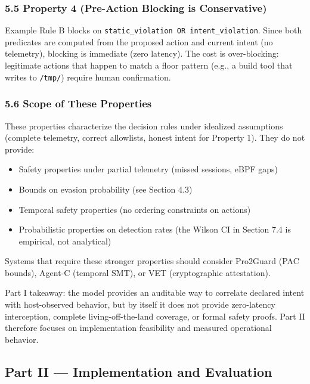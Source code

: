\documentclass[
]{article}
\providecommand{\tightlist}{%
  \setlength{\itemsep}{0pt}\setlength{\parskip}{0pt}}
\begin{document}
\subsubsection{5.5 Property 4 (Pre-Action Blocking is
Conservative)}\label{property-4-pre-action-blocking-is-conservative}

Example Rule B blocks on
\texttt{static\_violation\ OR\ intent\_violation}. Since both predicates
are computed from the proposed action and current intent (no telemetry),
blocking is immediate (zero latency). The cost is over-blocking:
legitimate actions that happen to match a floor pattern (e.g., a build
tool that writes to \texttt{/tmp/}) require human confirmation.

\subsubsection{5.6 Scope of These
Properties}\label{scope-of-these-properties}

These properties characterize the decision rules under idealized
assumptions (complete telemetry, correct allowlists, honest intent for
Property 1). They do not provide:

\begin{itemize}
\tightlist
\item
  Safety properties under partial telemetry (missed sessions, eBPF gaps)
\item
  Bounds on evasion probability (see Section 4.3)
\item
  Temporal safety properties (no ordering constraints on actions)
\item
  Probabilistic properties on detection rates (the Wilson CI in Section
  7.4 is empirical, not analytical)
\end{itemize}

Systems that require these stronger properties should consider Pro2Guard
(PAC bounds), Agent-C (temporal SMT), or VET (cryptographic
attestation).

Part I takeaway: the model provides an auditable way to correlate
declared intent with host-observed behavior, but by itself it does not
provide zero-latency interception, complete living-off-the-land
coverage, or formal safety proofs. Part II therefore focuses on
implementation feasibility and measured operational behavior.

\subsection{Part II --- Implementation and
Evaluation}\label{part-ii-implementation-and-evaluation}
\end{document}
